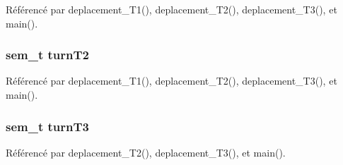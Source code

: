 Référencé par deplacement\+\_\+\+T1(), deplacement\+\_\+\+T2(), deplacement\+\_\+\+T3(), et main().

\subsubsection[{turn\+T2}]{\setlength{\rightskip}{0pt plus 5cm}sem\+\_\+t turn\+T2}\label{thread_8h_a8e975e7186117fd06d1ca1e75e848c74}


Référencé par deplacement\+\_\+\+T1(), deplacement\+\_\+\+T2(), deplacement\+\_\+\+T3(), et main().

\subsubsection[{turn\+T3}]{\setlength{\rightskip}{0pt plus 5cm}sem\+\_\+t turn\+T3}\label{thread_8h_a393f8d83d8e7f59a0328e7aef21a1420}


Référencé par deplacement\+\_\+\+T2(), deplacement\+\_\+\+T3(), et main().

